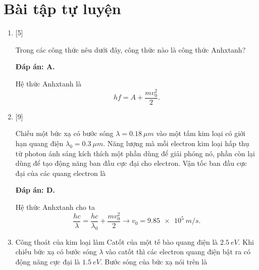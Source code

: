 \section{Bài tập tự luyện}
\begin{enumerate}[label=\bfseries Câu \arabic*:]
	
	\item {} [5]
	\cauhoi
	{Trong các công thức nêu dưới đây, công thức nào là công thức Anhxtanh?
	}
	
	\loigiai
	{		\textbf{Đáp án: A.}
		
		Hệ thức Anhxtanh là
		$$
		hf = A + \dfrac{mv_{0}^2}{2}.
		$$
	}
	
	\item {} [9]
	\cauhoi
	{Chiếu một bức xạ có bước sóng $\lambda = \SI{0,18}{\mu m}$ vào một tấm kim loại có giới hạn quang điện $\lambda_{0} = \SI{0,3}{\mu m}$. Năng lượng mà mỗi electron kim loại hấp thụ từ photon ánh sáng kích thích một phần dùng để giải phóng nó, phần còn lại dùng để tạo động năng ban đầu cực đại cho electron. Vận tốc ban đầu cực đại của các quang electron là
	}
	
	\loigiai
	{		\textbf{Đáp án: D.}
		
		Hệ thức Anhxtanh cho ta
		$$
		\dfrac{hc}{\lambda} = \dfrac{hc}{\lambda_{0}} + \dfrac{mv_{0}^2}{2} \rightarrow v_{0} = \SI{9,85e5}{m/s}.
		$$
	}
	
		\item {} 
	\cauhoi
	{Công thoát của kim loại làm Catốt của một tế bào quang điện là $\SI{2,5}{eV}$. Khi chiếu bức xạ có bước sóng $\lambda$ vào catốt thì các electron quang điện bật ra có động năng cực đại là $\SI{1,5}{eV}$. Bước sóng của bức xạ nói trên là
		
}
\end{enumerate}
